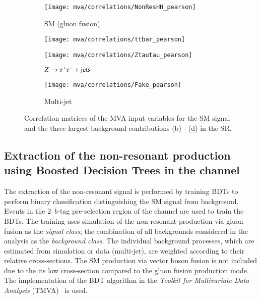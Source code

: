 \begin{figure}[htbp]
  \centering

  \begin{subfigure}[t]{.49\textwidth}
    \texttt{[image: mva/correlations/NonResHH\_pearson]}
    \caption{SM \HH (gluon fusion)}
  \end{subfigure}\hfill %
  \begin{subfigure}[t]{.49\textwidth}
    \texttt{[image: mva/correlations/ttbar\_pearson]}
    \caption{\ttbar}
  \end{subfigure}

  \begin{subfigure}[t]{.49\textwidth}
    \texttt{[image: mva/correlations/Ztautau\_pearson]}
    \caption{$Z \rightarrow \tau^{+} \tau^{-} + \text{jets}$}
  \end{subfigure}\hfill %
  \begin{subfigure}[t]{.49\textwidth}
    \texttt{[image: mva/correlations/Fake\_pearson]}
    \caption{Multi-jet}
  \end{subfigure}

  \caption{Correlation matrices of the MVA input variables for the SM
    \HH signal and the three largest background contributions (b) -
    (d) in the \hadhad SR.}
  \label{fig:mva_input_correlations}
\end{figure}


\subsection{Extraction of the non-resonant \HH production using
  Boosted Decision Trees in the \hadhad channel}
\label{sec:mva_smbdt}

The extraction of the non-resonant \HH signal is performed by training
BDTs to perform binary classification distinguishing the SM \HH signal
from background. Events in the 2~$b$-tag pre-selection region of the
\hadhad channel are used to train the BDTs. The training uses
simulation of the non-resonant \HH production via gluon fusion as the
\emph{signal class}; the combination of all backgrounds considered in
the analysis as the \emph{background class}.  The individual
background processes, which are estimated from simulation or data
(multi-jet), are weighted according to their relative
cross-sections. The SM \HH production via vector boson fusion is not
included due to the its low cross-section compared to the gluon fusion
production mode. The implementation of the BDT algorithm in the
\emph{Toolkit for Multivariate Data Analysis}
(TMVA)~\cite{Hocker:2007ht} is used.


